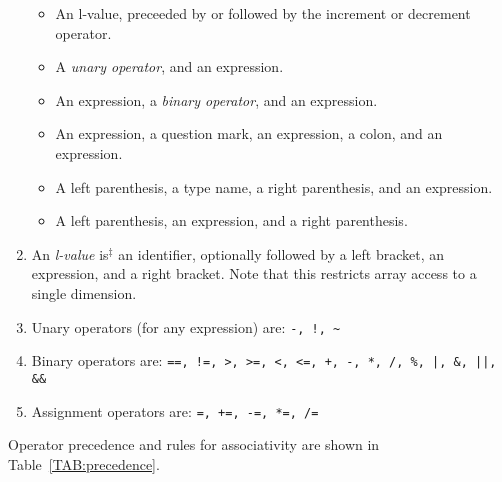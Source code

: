 \documentclass{article}
\newcommand{\isextra}{is$^\ddagger$ }
\begin{document}
\begin{enumerate}
\begin{itemize}
    \item An l-value, preceeded by or followed by the
    increment or decrement operator.

    \item A \emph{unary operator}, and an expression.

    \item An expression, a \emph{binary operator}, and an expression.

    \item An expression, a question mark, an expression, a colon,
    and an expression.

    \item A left parenthesis, a type name, a right parenthesis, and
    an expression.
    \item A left parenthesis, an expression, and a right parenthesis.
  \end{itemize}

\item \label{lvalue}
  An \emph{l-value} \isextra an identifier,
  optionally followed by a left bracket,
  an expression, and a right bracket.
  Note that this restricts array access to a single dimension.

\item
  Unary operators (for any expression) are: \verb|-, !, ~|

\item
  Binary operators are: \verb$==, !=, >, >=, <, <=, +, -, *, /, %, |, &, ||, &&$

\item
  Assignment operators are: \verb$=, +=, -=, *=, /=$
\end{enumerate}
%
%
Operator precedence and rules for associativity
are shown in Table~\ref{TAB:precedence}.
%
\end{document}
